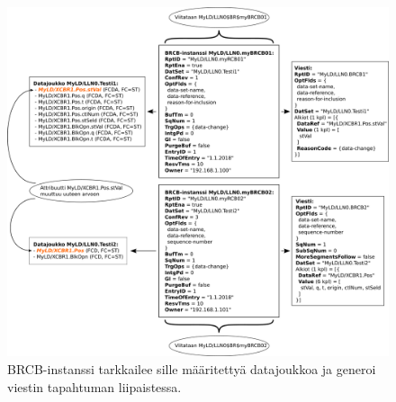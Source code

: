 \begin{figure}[ht!]
	\includegraphics[width=1\textwidth]{pictures/iec61850-data-set-reporting.png}
	\caption{BRCB-instanssi tarkkailee sille määritettyä datajoukkoa ja generoi viestin tapahtuman liipaistessa.}
	\label{fig:iec61850-data-set-reporting}
\end{figure}

